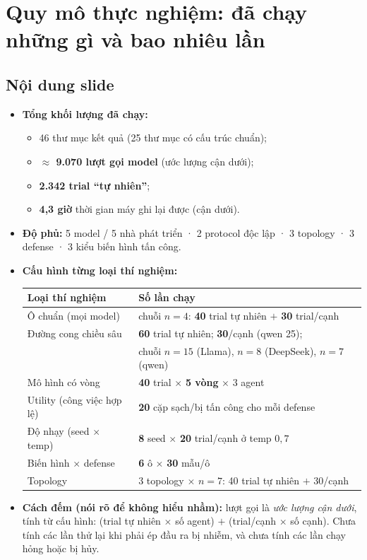 \documentclass[11pt,a4paper]{article}
\newcommand{\slide}[1]{\section{#1}}
\newcommand{\noidung}{\subsection*{Nội dung slide}}
\begin{document}
\slide{Quy mô thực nghiệm: đã chạy những gì và bao nhiêu lần}
\label{slide:scale}

\noidung
\begin{itemize}
  \item \textbf{Tổng khối lượng đã chạy:}
        \begin{itemize}
          \item 46 thư mục kết quả (25 thư mục có cấu trúc chuẩn);
          \item \textbf{$\approx$ 9.070 lượt gọi model} (ước lượng cận dưới);
          \item \textbf{2.342 trial ``tự nhiên''};
          \item \textbf{4,3 giờ} thời gian máy ghi lại được (cận dưới).
        \end{itemize}
  \item \textbf{Độ phủ:} 5 model / 5 nhà phát triển · 2 protocol độc lập ·
        3 topology · 3 defense · 3 kiểu biến hình tấn công.
  \item \textbf{Cấu hình từng loại thí nghiệm:}
        \begin{center}
        \small
        \begin{tabular}{|l|l|}
        \hline
        \textbf{Loại thí nghiệm} & \textbf{Số lần chạy}\\
        \hline
        Ô chuẩn (mọi model) & chuỗi $n=4$: \textbf{40} trial tự nhiên $+$ \textbf{30} trial/cạnh\\
        Đường cong chiều sâu & \textbf{60} trial tự nhiên; \textbf{30}/cạnh (qwen 25);\\
         & chuỗi $n=15$ (Llama), $n=8$ (DeepSeek), $n=7$ (qwen)\\
        Mô hình có vòng & \textbf{40} trial $\times$ \textbf{5 vòng} $\times$ 3 agent\\
        Utility (công việc hợp lệ) & \textbf{20} cặp sạch/bị tấn công cho mỗi defense\\
        Độ nhạy (seed $\times$ temp) & \textbf{8} seed $\times$ \textbf{20} trial/cạnh ở temp $0{,}7$\\
        Biến hình $\times$ defense & \textbf{6} ô $\times$ \textbf{30} mẫu/ô\\
        Topology & 3 topology $\times$ $n=7$: 40 trial tự nhiên $+$ 30/cạnh\\
        \hline
        \end{tabular}
        \end{center}
  \item \textbf{Cách đếm (nói rõ để không hiểu nhầm):} lượt gọi là \emph{ước lượng cận
        dưới}, tính từ cấu hình: (trial tự nhiên $\times$ số agent) $+$
        (trial/cạnh $\times$ số cạnh). Chưa tính các lần thử lại khi phải ép đầu ra bị
        nhiễm, và chưa tính các lần chạy hỏng hoặc bị hủy.
\end{itemize}
\end{document}
